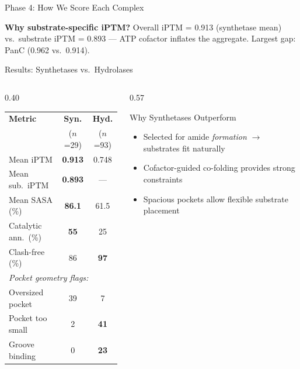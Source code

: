 \documentclass[aspectratio=169, 11pt]{beamer}
\begin{document}
\begin{frame}{Phase 4: How We Score Each Complex}
\vspace{2pt}
\colorbox{accentorange!15}{\parbox{0.92\textwidth}{\centering\scriptsize
\textbf{Why substrate-specific iPTM?} Overall iPTM = 0.913 (synthetase mean) vs.\ substrate iPTM = 0.893 --- ATP cofactor inflates the aggregate. Largest gap: PanC (0.962 vs.\ 0.914).
}}
\end{frame}

\begin{frame}{Results: Synthetases vs.\ Hydrolases}
\vspace{-6pt}

\begin{columns}[T]
\begin{column}{0.40\textwidth}
\begin{center}
\scriptsize
\begin{tabular}{lcc}
\toprule
\textbf{Metric} & \textbf{Syn.} & \textbf{Hyd.} \\
& {\tiny ($n$=29)} & {\tiny ($n$=93)} \\
\midrule
Mean iPTM & \textbf{0.913} & 0.748 \\
Mean sub.\ iPTM & \textbf{0.893} & --- \\
Mean SASA (\%) & \textbf{86.1} & 61.5 \\
Catalytic ann.\ (\%) & \textbf{55} & 25 \\
Clash-free (\%) & 86 & \textbf{97} \\
\midrule
\multicolumn{3}{l}{\textit{Pocket geometry flags:}} \\
Oversized pocket & 39 & 7 \\
Pocket too small & 2 & \textcolor{accentred}{\textbf{41}} \\
Groove binding & 0 & \textcolor{accentred}{\textbf{23}} \\
\bottomrule
\end{tabular}
\end{center}
\end{column}

\begin{column}{0.57\textwidth}
\begin{exampleblock}{Why Synthetases Outperform}
\begin{itemize}\scriptsize
\item Selected for amide \textit{formation} $\rightarrow$ substrates fit naturally
\item Cofactor-guided co-folding provides strong constraints
\item Spacious pockets allow flexible substrate placement
\end{itemize}
\end{exampleblock}


\end{column}
\end{columns}
\end{frame}
\end{document}
